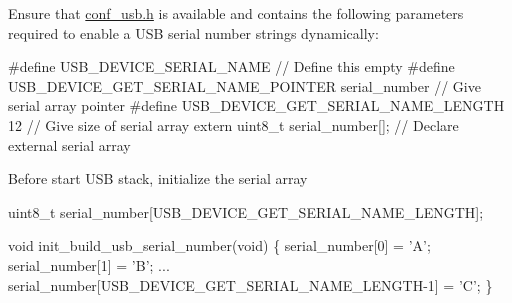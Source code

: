 \begin{DoxyEnumerate}
\item Ensure that \hyperlink{conf__usb_8h}{conf\-\_\-usb.\-h} is available and contains the following parameters required to enable a U\-S\-B serial number strings dynamically\-:
\begin{DoxyItemize}
\item 
\begin{DoxyCode}
\textcolor{preprocessor}{ #define  USB\_DEVICE\_SERIAL\_NAME // Define this empty}
\textcolor{preprocessor}{}\textcolor{preprocessor}{        #define  USB\_DEVICE\_GET\_SERIAL\_NAME\_POINTER serial\_number // Give
       serial array pointer}
\textcolor{preprocessor}{}\textcolor{preprocessor}{        #define  USB\_DEVICE\_GET\_SERIAL\_NAME\_LENGTH  12 // Give size of serial
       array}
\textcolor{preprocessor}{        extern uint8\_t serial\_number[]; // Declare external serial array }
\end{DoxyCode}

\end{DoxyItemize}
\item Before start U\-S\-B stack, initialize the serial array
\begin{DoxyItemize}
\item 
\begin{DoxyCode}
         uint8\_t serial\_number[USB\_DEVICE\_GET\_SERIAL\_NAME\_LENGTH];

         \textcolor{keywordtype}{void} init\_build\_usb\_serial\_number(\textcolor{keywordtype}{void})
         \{
         serial\_number[0] = \textcolor{charliteral}{'A'};
         serial\_number[1] = \textcolor{charliteral}{'B'};
         ...
         serial\_number[USB\_DEVICE\_GET\_SERIAL\_NAME\_LENGTH-1] = \textcolor{charliteral}{'C'};
         \} 
\end{DoxyCode}
 
\end{DoxyItemize}
\end{DoxyEnumerate}